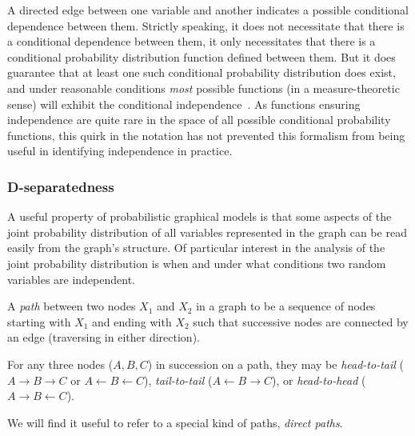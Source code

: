 \documentclass[../thesis.tex]{subfiles}
\begin{document}
A directed edge between one variable and another
indicates a possible
conditional dependence between them.
Strictly speaking, it does not
necessitate that there is a conditional dependence between them,
it only necessitates that there is a conditional
probability distribution
function defined between them.
But it does guarantee that at least one such conditional
probability distribution does exist, and under reasonable
conditions \emph{most} possible functions
(in a measure-theoretic sense) will exhibit
the conditional independence~\cite{meek1995strong}.
As functions ensuring
independence are quite rare in the space of all possible
conditional probability functions, this quirk in the
notation has not prevented
this formalism from being useful in identifying
independence in practice.


\subsubsection{D-separatedness}

A useful property of probabilistic graphical models
is that some aspects of the joint probability
distribution of all variables represented in the graph
can be read easily from the graph's structure.
Of particular interest in the analysis of the joint probability
distribution is when and under what conditions
two random variables are independent.

\begin{dfn}[Path]
A \emph{path} between two nodes \(X_1\) and \(X_2\)  in a graph 
to be a sequence of nodes starting with \(X_1\) and ending with \(X_2\)
such that successive nodes are connected by an edge (traversing
in either direction).
\end{dfn}

\begin{dfn}
For any three nodes (\(A, B,C\)) in succession on a
path, they may be \emph{head-to-tail} 
(\(A \rightarrow B \rightarrow C\) or \(A \leftarrow B \leftarrow C\)), 
\emph{tail-to-tail} (\(A \leftarrow B \rightarrow C\)), or \emph{head-to-head}
(\(A \rightarrow B \leftarrow C\)).
\end{dfn}

We will find it useful to refer to a special kind of paths, \emph{direct paths}.
\end{document}
